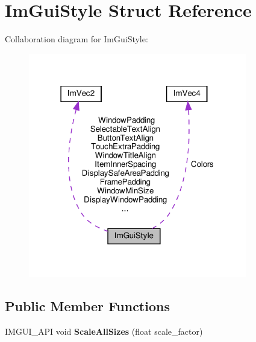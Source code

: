 \hypertarget{structImGuiStyle}{}\section{Im\+Gui\+Style Struct Reference}
\label{structImGuiStyle}


Collaboration diagram for Im\+Gui\+Style\+:\nopagebreak
\begin{figure}[H]
\begin{center}
\leavevmode
\includegraphics[width=271pt]{structImGuiStyle__coll__graph}
\end{center}
\end{figure}
\subsection*{Public Member Functions}
\begin{DoxyCompactItemize}
\item 
\mbox{\label{structImGuiStyle_a7c9d3e0974a239f65e433cc952be0627}} 
I\+M\+G\+U\+I\+\_\+\+A\+PI void {\bfseries Scale\+All\+Sizes} (float scale\+\_\+factor)
\end{DoxyCompactItemize}
